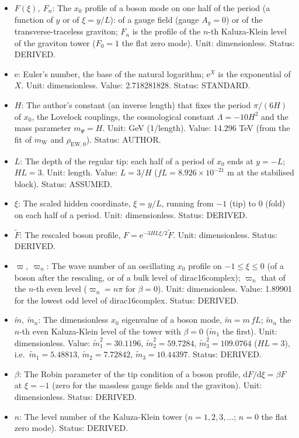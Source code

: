 \documentclass[
  10pt,
]{article}
\providecommand{\tightlist}{%
  \setlength{\itemsep}{0pt}\setlength{\parskip}{0pt}}
\begin{document}
\begin{itemize}
\tightlist
\item
  \(F(\xi),\ F_n\): The \(x_0\) profile of a boson mode on one half of
  the period (a function of \(y\) or of \(\xi = y/L\)): of a gauge field
  (gauge \(A_y = 0\)) or of the transverse-traceless graviton; \(F_n\)
  is the profile of the \(n\)-th Kaluza-Klein level of the graviton
  tower (\(F_0 = 1\) the flat zero mode). Unit: dimensionless. Status:
  DERIVED.
\item
  \(\mathrm{e}\): Euler's number, the base of the natural logarithm;
  \(\mathrm{e}^{X}\) is the exponential of \(X\). Unit: dimensionless.
  Value: 2.718281828. Status: STANDARD.
\item
  \(H\): The author's constant (an inverse length) that fixes the period
  \(\pi/(6H)\) of \(x_0\), the Lovelock couplings, the cosmological
  constant \(\Lambda = -10H^2\) and the mass parameter \(m_\Psi = H\).
  Unit: GeV (1/length). Value: 14.296 TeV (from the fit of
  \(m_{\mathrm{W}}\) and \(\rho_{\mathrm{EW},0}\)). Status: AUTHOR.
\item
  \(L\): The depth of the regular tip: each half of a period of \(x_0\)
  ends at \(y = -L\); \(HL = 3\). Unit: length. Value: \(L = 3/H\)
  (\(fL = 8.926\times10^{-21}\) m at the stabilised block). Status:
  ASSUMED.
\item
  \(\xi\): The scaled hidden coordinate, \(\xi = y/L\), running from
  \(-1\) (tip) to \(0\) (fold) on each half of a period. Unit:
  dimensionless. Status: DERIVED.
\item
  \(\tilde F\): The rescaled boson profile,
  \(F = \mathrm{e}^{-3HL\xi/2}\tilde F\). Unit: dimensionless. Status:
  DERIVED.
\item
  \(\varpi,\ \varpi_n\): The wave number of an oscillating \(x_0\)
  profile on \(-1 \le \xi \le 0\) (of a boson after the rescaling, or of
  a bulk level of dirac16complex); \(\varpi_n\) that of the \(n\)-th
  even level (\(\varpi_n = n\pi\) for \(\beta = 0\)). Unit:
  dimensionless. Value: 1.89901 for the lowest odd level of
  dirac16complex. Status: DERIVED.
\item
  \(\tilde m,\ \tilde m_n\): The dimensionless \(x_0\) eigenvalue of a
  boson mode, \(\tilde m = m\,fL\); \(\tilde m_n\) the \(n\)-th even
  Kaluza-Klein level of the tower with \(\beta = 0\) (\(\tilde m_1\) the
  first). Unit: dimensionless. Value: \(\tilde m_1^2 = 30.1196\),
  \(\tilde m_2^2 = 59.7284\), \(\tilde m_3^2 = 109.0764\) (\(HL = 3\)),
  i.e.~\(\tilde m_1 = 5.48813\), \(\tilde m_2 = 7.72842\),
  \(\tilde m_3 = 10.44397\). Status: DERIVED.
\item
  \(\beta\): The Robin parameter of the tip condition of a boson
  profile, \(\mathrm{d}F/\mathrm{d}\xi = \beta F\) at \(\xi = -1\) (zero
  for the massless gauge fields and the graviton). Unit: dimensionless.
  Status: DERIVED.
\item
  \(n\): The level number of the Kaluza-Klein tower
  (\(n = 1, 2, 3, \dots\); \(n = 0\) the flat zero mode). Status:
  DERIVED.
\end{itemize}
\end{document}
